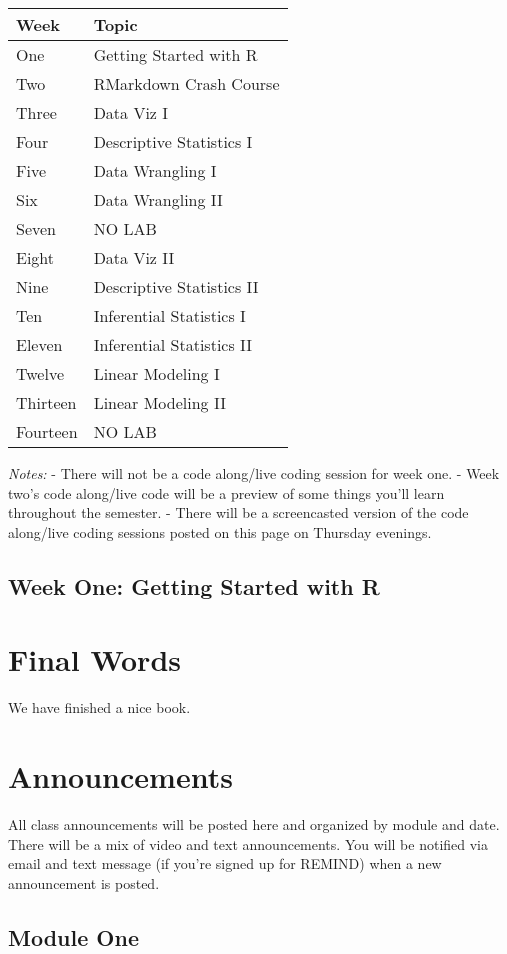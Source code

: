 \documentclass[
]{book}
\begin{document}
\begin{tabular}{l|l}
\hline
Week & Topic\\
\hline
One & Getting Started with R\\
\hline
Two & RMarkdown Crash Course\\
\hline
Three & Data Viz I\\
\hline
Four & Descriptive Statistics I\\
\hline
Five & Data Wrangling I\\
\hline
Six & Data Wrangling II\\
\hline
Seven & NO LAB\\
\hline
Eight & Data Viz II\\
\hline
Nine & Descriptive Statistics II\\
\hline
Ten & Inferential Statistics I\\
\hline
Eleven & Inferential Statistics II\\
\hline
Twelve & Linear Modeling I\\
\hline
Thirteen & Linear Modeling II\\
\hline
Fourteen & NO LAB\\
\hline
\end{tabular}

\emph{Notes:}
- There will not be a code along/live coding session for week one.
- Week two's code along/live code will be a preview of some things you'll learn throughout the semester.
- There will be a screencasted version of the code along/live coding sessions posted on this page on Thursday evenings.

\hypertarget{week-one-getting-started-with-r}{%
\section{Week One: Getting Started with R}\label{week-one-getting-started-with-r}}

\hypertarget{final-words}{%
\chapter{Final Words}\label{final-words}}

We have finished a nice book.

\hypertarget{announcements}{%
\chapter{Announcements}\label{announcements}}

All class announcements will be posted here and organized by module and date. There will be a mix of video and text announcements. You will be notified via email and text message (if you're signed up for REMIND) when a new announcement is posted.

\hypertarget{module-one}{%
\section{Module One}\label{module-one}}

  
\end{document}
